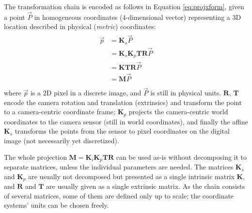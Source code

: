 The transformation chain \cite[p. 163]{hartley03multiview} is encoded as follows in Equation \ref{eq:projxform}, given a point $\vec P$ in homogeneous coordinates (4-dimensional vector) representing a 3D location described in physical (\emph{metric}) coordinates:
\begin{align} \label{eq:projxform} \begin{split}
	\vec p
	&= \bm K_s \vec P\\
	&= \bm K_s \bm K_p \bm T \bm R \vec P\\
	&= \bm K \bm T \bm R \vec P\\
	&= \bm M \vec P\\
\end{split} \end{align}
where $\vec p$ is a 2D pixel in a discrete image, and $\vec P$ is still in physical units.
$\bm R$, $\bm T$ encode the camera rotation and translation (extrinsics) and transform the point to a camera-centric coordinate frame;
$\bm K_p$ projects the camera-centric world coordinates to the camera sensor (still in world coordinates), and finally the affine $\bm K_s$ transforms the points from the sensor to pixel coordinates on the digital image (not necessarily yet discretized).


The whole projection $\bm M = \bm K_i \bm K_p \bm T \bm R$ can be used as-is without decomposing it to separate matrices, unless the individual parameters are needed.
The matrices $\bm K_s$ and $\bm K_p$ are usually not decomposed but presented as a single intrinsic matrix $\bm K$, and $\bm R$ and $\bm T$ are usually given as a single extrinsic matrix.
As the chain consists of several matrices, some of them are defined only up to scale; the coordinate systems' units can be chosen freely.



